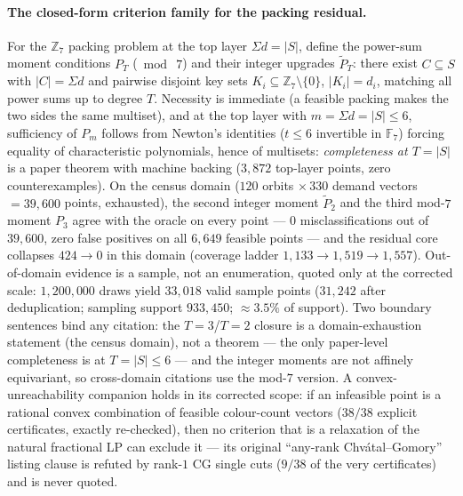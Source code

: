 \paragraph{The closed-form criterion family for the packing residual.}
For the $\mathbb{Z}_7$ packing problem at the top layer $\Sigma d=|S|$,
define the power-sum moment conditions $P_T$ ($\bmod\ 7$) and their
integer upgrades $\widetilde P_T$: there exist $C\subseteq S$ with
$|C|=\Sigma d$ and pairwise disjoint key sets $K_i\subseteq
\mathbb{Z}_7\setminus\{0\}$, $|K_i|=d_i$, matching all power sums up to
degree $T$. Necessity is immediate (a feasible packing makes the two sides
the same multiset), and at the top layer with $m=\Sigma d=|S|\le6$,
sufficiency of $P_m$ follows from Newton's identities ($t\le6$ invertible
in $\mathbb{F}_7$) forcing equality of characteristic polynomials, hence
of multisets: \emph{completeness at $T=|S|$} is a paper theorem with
machine backing ($3{,}872$ top-layer points, zero counterexamples). On the
census domain ($120$ orbits $\times\,330$ demand vectors $=39{,}600$
points, exhausted), the second integer moment $\widetilde P_2$ and the
third mod-$7$ moment $P_3$ agree with the oracle on every point ---
$0$ misclassifications out of $39{,}600$, zero false positives on all
$6{,}649$ feasible points --- and the residual core collapses $424\to0$ in
this domain (coverage ladder $1{,}133\to1{,}519\to1{,}557$). Out-of-domain
evidence is a sample, not an enumeration, quoted only at the corrected
scale: $1{,}200{,}000$ draws yield $33{,}018$ valid sample points
($31{,}242$ after deduplication; sampling support $933{,}450$;
$\approx3.5\%$ of support). Two boundary sentences bind any citation: the
$T=3$/$T=2$ closure is a domain-exhaustion statement (the census domain),
not a theorem --- the only paper-level completeness is at $T=|S|\le6$ ---
and the integer moments are not affinely equivariant, so cross-domain
citations use the mod-$7$ version. A convex-unreachability companion
holds in its corrected scope: if an infeasible point is a rational convex
combination of feasible colour-count vectors ($38/38$ explicit
certificates, exactly re-checked), then no criterion that is a relaxation
of the natural fractional LP can exclude it --- its original
``any-rank Chv\'atal--Gomory'' listing clause is refuted by rank-$1$
CG single cuts ($9/38$ of the very certificates) and is never quoted.

